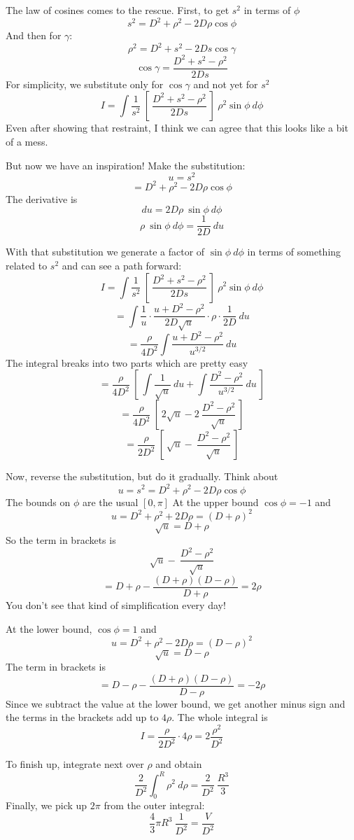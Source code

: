 \documentclass[11pt, oneside]{article}
\begin{document}
The law of cosines comes to the rescue.  First, to get $s^2$ in terms of $\phi$
\[ s^2 = D^2 + \rho^2 - 2 D \rho \cos \phi \]
And then for $\gamma$:
\[ \rho^2 = D^2 + s^2 - 2Ds \cos \gamma \]
\[ \cos \gamma = \frac{D^2 + s^2 - \rho^2}{2Ds} \]
For simplicity, we substitute only for $\cos \gamma$ and not yet for $s^2$ 
\[ I = \int \frac{1}{s^2} \ [ \  \frac{D^2 + s^2 - \rho^2}{2Ds}  \ ] \ \rho^2 \sin \phi \ d \phi \]
Even after showing that restraint, I think we can agree that this looks like a bit of a mess.  

But now we have an inspiration! Make the substitution:
\[ u = s^2 \]
\[ = D^2 + \rho^2 - 2 D \rho \cos \phi \]
The derivative is
\[ du = 2 D \rho \ \sin \phi \ d \phi \]
\[ \rho \ \sin \phi \ d \phi = \frac{1}{2D} \ du \]

With that substitution we generate a factor of $\sin \phi \ d \phi$ in terms of something related to $s^2$ and can see a path forward:
\[ I = \int \frac{1}{s^2} \ [ \  \frac{D^2 + s^2 - \rho^2}{2Ds}  \ ] \ \rho^2 \sin \phi \ d \phi \]
\[ = \int \frac{1}{u} \cdot \frac{u + D^2 - \rho^2}{2D \sqrt{u}} \cdot \rho \cdot \frac{1}{2D} \ du\]
\[ = \frac{\rho}{4D^2} \int \frac{u + D^2 - \rho^2}{u^{3/2}} \ du \]
The integral breaks into two parts which are pretty easy
\[  = \frac{\rho}{4D^2} \ [ \  \int \frac{1}{\sqrt{u}} \ du + \int \frac{D^2 - \rho^2}{u^{3/2}} \ du \ ]  \]
\[ = \frac{\rho}{4D^2} \ [ \ 2 \sqrt{u} - 2 \ \frac{D^2 - \rho^2}{\sqrt{u}}  \ ] \]
\[ = \frac{\rho}{2D^2} \ [ \ \sqrt{u} - \ \frac{D^2 - \rho^2}{\sqrt{u}}  \ ] \]

Now, reverse the substitution, but do it gradually.  Think about
\[ u = s^2 = D^2 + \rho^2 - 2 D \rho \cos \phi \]
The bounds on $\phi$ are the usual $[0,\pi]$  At the upper bound $\cos \phi = -1$ and
\[ u = D^2 + \rho^2 + 2 D \rho = (D + \rho)^2 \]
\[ \sqrt{u} = D + \rho \]
So the term in brackets is 
\[ \sqrt{u} - \ \frac{D^2 - \rho^2}{\sqrt{u}} \]
\[ = D + \rho - \frac{(D + \rho)(D - \rho)}{D + \rho} = 2 \rho \]
You don't see that kind of simplification every day!

At the lower bound, $\cos \phi = 1$ and
\[ u = D^2 + \rho^2 - 2 D \rho = (D - \rho)^2 \]
\[ \sqrt{u} = D - \rho \]
The term in brackets is
\[ = D - \rho - \frac{(D + \rho)(D - \rho)}{D - \rho} = - 2 \rho \]
Since we subtract the value at the lower bound, we get another minus sign and the terms in the brackets add up to $4 \rho$.  The whole integral is
\[ I = \frac{\rho}{2D^2} \cdot 4 \rho = 2 \frac{\rho^2}{D^2} \]

To finish up, integrate next over $\rho$ and obtain
\[ \frac{2}{D^2} \int_0^R \rho^2 \ d \rho = \frac{2}{D^2} \ \frac{R^3}{3} \]
Finally, we pick up $2 \pi$ from the outer integral:
\[ \frac{4}{3} \pi R^3 \ \frac{1}{D^2} = \frac{V}{D^2}  \]
\end{document}
